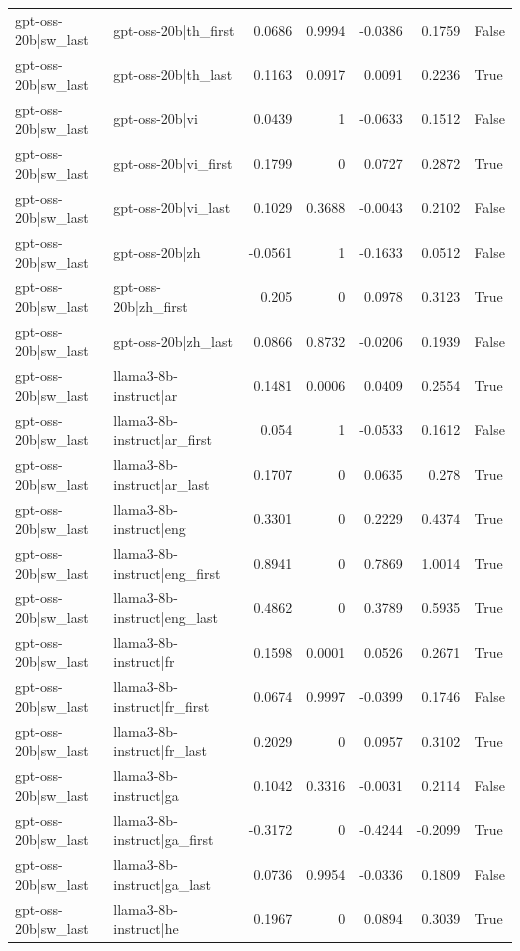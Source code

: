 \begin{table}
\begin{tabular}{l l r r r r l}
gpt-oss-20b|sw_last & gpt-oss-20b|th_first & 0.0686 & 0.9994 & -0.0386 & 0.1759 & False \\
gpt-oss-20b|sw_last & gpt-oss-20b|th_last & 0.1163 & 0.0917 & 0.0091 & 0.2236 & True \\
gpt-oss-20b|sw_last & gpt-oss-20b|vi & 0.0439 & 1 & -0.0633 & 0.1512 & False \\
gpt-oss-20b|sw_last & gpt-oss-20b|vi_first & 0.1799 & 0 & 0.0727 & 0.2872 & True \\
gpt-oss-20b|sw_last & gpt-oss-20b|vi_last & 0.1029 & 0.3688 & -0.0043 & 0.2102 & False \\
gpt-oss-20b|sw_last & gpt-oss-20b|zh & -0.0561 & 1 & -0.1633 & 0.0512 & False \\
gpt-oss-20b|sw_last & gpt-oss-20b|zh_first & 0.205 & 0 & 0.0978 & 0.3123 & True \\
gpt-oss-20b|sw_last & gpt-oss-20b|zh_last & 0.0866 & 0.8732 & -0.0206 & 0.1939 & False \\
gpt-oss-20b|sw_last & llama3-8b-instruct|ar & 0.1481 & 0.0006 & 0.0409 & 0.2554 & True \\
gpt-oss-20b|sw_last & llama3-8b-instruct|ar_first & 0.054 & 1 & -0.0533 & 0.1612 & False \\
gpt-oss-20b|sw_last & llama3-8b-instruct|ar_last & 0.1707 & 0 & 0.0635 & 0.278 & True \\
gpt-oss-20b|sw_last & llama3-8b-instruct|eng & 0.3301 & 0 & 0.2229 & 0.4374 & True \\
gpt-oss-20b|sw_last & llama3-8b-instruct|eng_first & 0.8941 & 0 & 0.7869 & 1.0014 & True \\
gpt-oss-20b|sw_last & llama3-8b-instruct|eng_last & 0.4862 & 0 & 0.3789 & 0.5935 & True \\
gpt-oss-20b|sw_last & llama3-8b-instruct|fr & 0.1598 & 0.0001 & 0.0526 & 0.2671 & True \\
gpt-oss-20b|sw_last & llama3-8b-instruct|fr_first & 0.0674 & 0.9997 & -0.0399 & 0.1746 & False \\
gpt-oss-20b|sw_last & llama3-8b-instruct|fr_last & 0.2029 & 0 & 0.0957 & 0.3102 & True \\
gpt-oss-20b|sw_last & llama3-8b-instruct|ga & 0.1042 & 0.3316 & -0.0031 & 0.2114 & False \\
gpt-oss-20b|sw_last & llama3-8b-instruct|ga_first & -0.3172 & 0 & -0.4244 & -0.2099 & True \\
gpt-oss-20b|sw_last & llama3-8b-instruct|ga_last & 0.0736 & 0.9954 & -0.0336 & 0.1809 & False \\
gpt-oss-20b|sw_last & llama3-8b-instruct|he & 0.1967 & 0 & 0.0894 & 0.3039 & True \\

\end{tabular}
\end{table}
